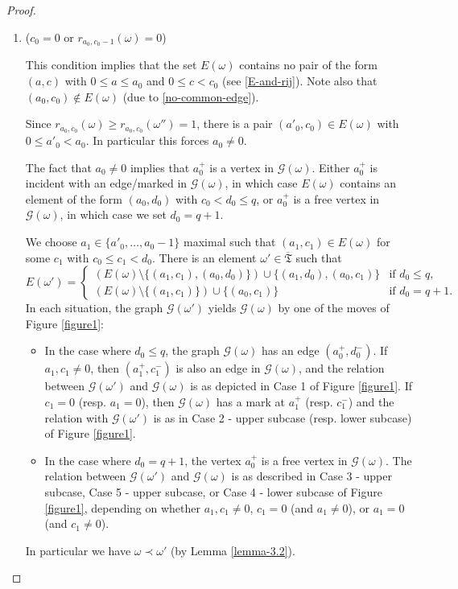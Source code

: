 \documentclass[ALCO,Unicode]{cedram}
\newcommand{\ppermutationsof}{\mathfrak{T}}
\newcommand{\parameters}{\overline{\ppermutationsof}}
\begin{document}
\begin{proof}
\begin{enumerate}[label=\textbf{Case \arabic*}]
\item ($c_0=0$ or $r_{a_0,c_0-1}(\omega)=0$)

\noindent This condition implies that the set $E(\omega)$ contains no pair of the form $(a,c)$ with $0\leq a\leq a_0$ and $0\leq c<c_0$ (see \eqref{E-and-rij}).
Note also that $(a_0,c_0)\notin E(\omega)$ (due to \eqref{no-common-edge}).

Since $r_{a_0,c_0}(\omega)\geq r_{a_0,c_0}(\omega'')=1$, there is a pair $(a'_0,c_0)\in E(\omega)$ with $0\leq a'_0< a_0$.
In particular this forces $a_0\not=0$.

The fact that $a_0\not=0$ implies that $a_0^+$ is a vertex in $\mathcal{G}(\omega)$. Either $a_0^+$ is incident with an edge/marked in $\mathcal{G}(\omega)$, in which case $E(\omega)$ contains an element of the form $(a_0,d_0)$ with $c_0< d_0\leq q$, or $a_0^+$ is a free vertex in $\mathcal{G}(\omega)$, in which case we set $d_0=q+1$.

We choose $a_1\in\{a'_0,\ldots,a_0-1\}$ maximal such that $(a_1,c_1)\in E(\omega)$ for some $c_1$ with $c_0\leq c_1<d_0$.
There is an element
$\omega'\in\parameters$ such that
\[
E(\omega')=\left\{\begin{array}{ll}
(E(\omega)\setminus\{(a_1,c_1),(a_0,d_0)\})\cup\{(a_1,d_0),(a_0,c_1)\} & \mbox{if $d_0\leq q$},\\
(E(\omega)\setminus\{(a_1,c_1)\})\cup\{(a_0,c_1)\} & \mbox{if $d_0=q+1$}.
\end{array}
\right.
\]
In each situation, the graph $\mathcal{G}(\omega')$ yields $\mathcal{G}(\omega)$ by one of the moves of Figure \ref{figure1}:
\begin{itemize}
\item In the case where $d_0\leq q$,
the graph $\mathcal{G}(\omega)$ has an edge $(a_0^+,d_0^-)$. If
$a_1,c_1\not=0$, then $(a_1^+,c_1^-)$ is also an edge in
$\mathcal{G}(\omega)$, and the relation between
$\mathcal{G}(\omega')$ and $\mathcal{G}(\omega)$ is as depicted in
Case 1 of Figure \ref{figure1}. If $c_1=0$ (resp. $a_1=0$), then
$\mathcal{G}(\omega)$ has a mark at $a_1^+$ (resp. $c_1^-$) and the
relation with $\mathcal{G}(\omega')$ is as in Case 2 - upper subcase
(resp. lower subcase) of Figure \ref{figure1}.
\item In the case where $d_0=q+1$, the vertex $a_0^+$ is a free vertex in $\mathcal{G}(\omega)$. The relation between $\mathcal{G}(\omega')$ and $\mathcal{G}(\omega)$ is as described in Case 3 - upper subcase, Case 5 - upper subcase, or Case 4 - lower subcase of Figure \ref{figure1}, depending on whether
$a_1,c_1\not=0$, $c_1=0$ (and $a_1\not=0$), or $a_1=0$ (and $c_1\not=0$).
\end{itemize}
In particular we have $\omega\prec\omega'$ (by Lemma \ref{lemma-3.2}).


\end{enumerate}
\end{proof}
\end{document}
